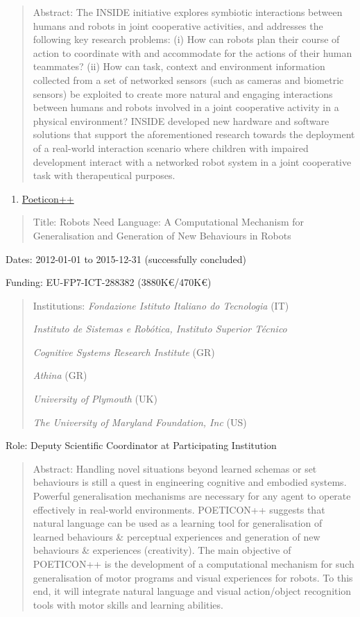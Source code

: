 \documentclass[
]{article}
\begin{document}
\begin{quote}
Abstract: The INSIDE initiative explores symbiotic interactions between
humans and robots in joint cooperative activities, and addresses the
following key research problems: (i) How can robots plan their course of
action to coordinate with and accommodate for the actions of their human
teammates? (ii) How can task, context and environment information
collected from a set of networked sensors (such as cameras and biometric
sensors) be exploited to create more natural and engaging interactions
between humans and robots involved in a joint cooperative activity in a
physical environment? INSIDE developed new hardware and software
solutions that support the aforementioned research towards the
deployment of a real-world interaction scenario where children with
impaired development interact with a networked robot system in a joint
cooperative task with therapeutical purposes.
\end{quote}

\begin{enumerate}
\def\labelenumi{\arabic{enumi}.}
\setcounter{enumi}{7}
\item
  \ul{Poeticon++}
\end{enumerate}

\begin{quote}
Title: Robots Need Language: A Computational Mechanism for
Generalisation and Generation of New Behaviours in Robots
\end{quote}

Dates: 2012-01-01 to 2015-12-31 (successfully concluded)

Funding: EU-FP7-ICT-288382 (3880K€/470K€)

\begin{quote}
Institutions: \emph{Fondazione Istituto Italiano do Tecnologia} (IT)

\emph{Instituto de Sistemas e Robótica, Instituto Superior Técnico}

\emph{Cognitive Systems Research Institute} (GR)

\emph{Athina} (GR)

\emph{University of Plymouth} (UK)

\emph{The University of Maryland Foundation, Inc} (US)
\end{quote}

Role: Deputy Scientific Coordinator at Participating Institution

\begin{quote}
Abstract: Handling novel situations beyond learned schemas or set
behaviours is still a quest in engineering cognitive and embodied
systems. Powerful generalisation mechanisms are necessary for any agent
to operate effectively in real-world environments. POETICON++ suggests
that natural language can be used as a learning tool for generalisation
of learned behaviours \& perceptual experiences and generation of new
behaviours \& experiences (creativity). The main objective of POETICON++
is the development of a computational mechanism for such generalisation
of motor programs and visual experiences for robots. To this end, it
will integrate natural language and visual action/object recognition
tools with motor skills and learning abilities.
\end{quote}
\end{document}
